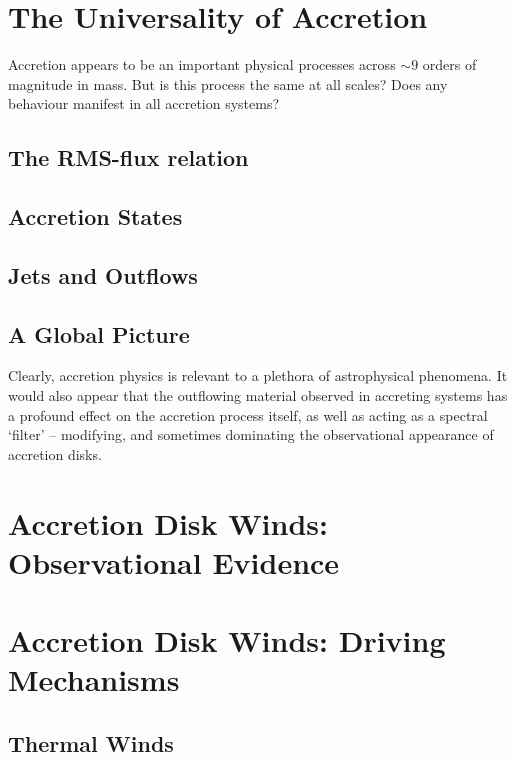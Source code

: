 \section{The Universality of Accretion}

Accretion appears to be an important physical processes across $\sim9$ orders
of magnitude in mass. But is this process the same at all scales? Does any 
behaviour manifest in all accretion systems? 

\subsection{The RMS-flux relation}


\subsection{Accretion States}


\subsection{Jets and Outflows}


\subsection{A Global Picture}

Clearly, accretion physics is relevant to a plethora of astrophysical phenomena. 
It would also appear that the outflowing material observed in accreting systems 
has a profound effect on the accretion process itself, as well as acting 
as a spectral `filter' -- modifying, and sometimes dominating the observational 
appearance of accretion disks.












\section{Accretion Disk Winds: Observational Evidence}

\section{Accretion Disk Winds: Driving Mechanisms}

\subsection{Thermal Winds}

